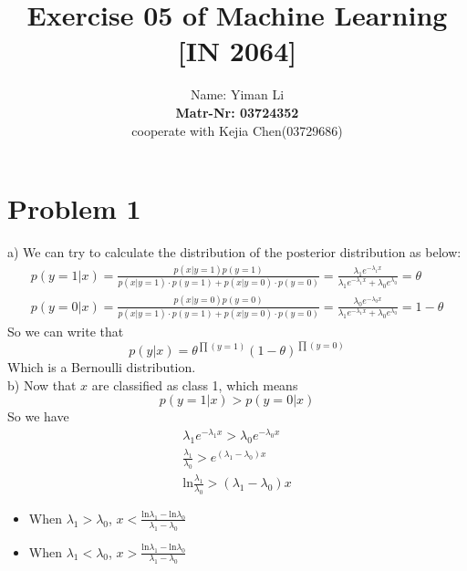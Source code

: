 \documentclass{article}
\title{Exercise 05 of Machine Learning [IN 2064]}
\author{
  Name: Yiman Li \\
  \textbf{Matr-Nr: 03724352} \\
  cooperate with Kejia Chen(03729686)\\
}
\begin{document}
\maketitle

\section*{Problem 1}
a) We can try to calculate the distribution of the posterior distribution as below:
\begin{eqnarray}
p(y=1|x)= \frac{p(x|y=1)p(y=1)}{p(x|y=1)\cdot p(y=1)+p(x|y=0)\cdot p(y=0)}= \frac{\lambda_1e^{-\lambda_1x}}{\lambda_1e^{-\lambda_1x}+\lambda_0e^{\lambda_0}} = \theta\\
p(y=0|x)= \frac{p(x|y=0)p(y=0)}{p(x|y=1)\cdot p(y=1)+p(x|y=0)\cdot p(y=0)}= \frac{\lambda_0e^{-\lambda_0x}}{\lambda_1e^{-\lambda_1x}+\lambda_0e^{\lambda_0}} = 1-\theta
\end{eqnarray}
So we can write that
\begin{equation}
p(y|x) = \theta^{\prod(y=1)}(1-\theta)^{\prod(y=0)}
\end{equation}
Which is a Bernoulli distribution.\\
b) Now that $x$ are classified as class 1, which means
\begin{equation}
p(y=1|x) > p(y=0|x)
\end{equation}
So we have
\begin{eqnarray}
\lambda_1e^{-\lambda_1x} > \lambda_0e^{-\lambda_0x}\\
\frac{\lambda_1}{\lambda_0} > e^{(\lambda_1-\lambda_0)x}\\
\mathrm{ln}\frac{\lambda_1}{\lambda_0} > (\lambda_1-\lambda_0)x
\end{eqnarray}
\begin{itemize}
	\item When $\lambda_1>\lambda_0$, $x < \frac{\mathrm{ln}\lambda_1 - \mathrm{ln}\lambda_0}{\lambda_1-\lambda_0}$

	\item When $\lambda_1<\lambda_0$, $x > \frac{\mathrm{ln}\lambda_1 - \mathrm{ln}\lambda_0}{\lambda_1-\lambda_0}$
\end{itemize}
\end{document}
